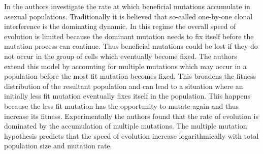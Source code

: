 \documentclass[float=false, crop=false]{standalone}
\begin{document}
	
	In \cite{Desai2007} the authors investigate the rate at which beneficial mutations accumulate in asexual populations. Traditionally it is believed that so-called one-by-one clonal interference is the dominating dynamic. In this regime the overall speed of evolution is limited because the dominant mutation needs to fix itself before the mutation process can continue. Thus beneficial mutations could be lost if they do not occur in the group of cells which eventually become fixed. The authors extend this model by accounting for multiple mutations which may occur in a population before the most fit mutation becomes fixed. This broadens the fitness distribution of the resultant population and can lead to a situation where an initially less fit mutation eventually fixes itself in the population. This happens because the less fit mutation has the opportunity to mutate again and thus increase its fitness. Experimentally the authors found that the rate of evolution is dominated by the accumulation of multiple mutations. The multiple mutation hypothesis predicts that the speed of evolution increase logarithmically with total population size and mutation rate.  

	\ifstandalone
			
		
	\fi
\end{document}
